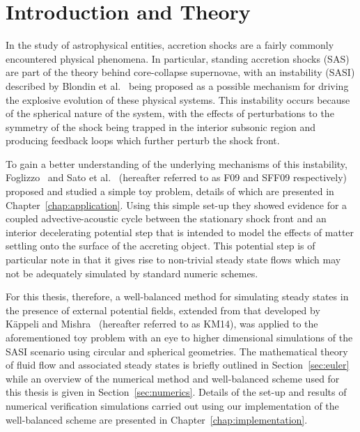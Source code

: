\newcommand{\package}{\emph}

\chapter{Introduction and Theory}
\label{chap:introduction}

In the study of astrophysical entities, accretion shocks are a fairly commonly encountered physical phenomena. In particular, standing accretion shocks (SAS) are part of the theory behind core-collapse supernovae, with an instability (SASI) described by Blondin et al.~\cite{Blondin2003} being proposed as a possible mechanism for driving the explosive evolution of these physical systems. This instability occurs because of the spherical nature of the system, with the effects of perturbations to the symmetry of the shock being trapped in the interior subsonic region and producing feedback loops which further perturb the shock front.

To gain a better understanding of the underlying mechanisms of this instability, Foglizzo~\cite{Foglizzo2009} and Sato et al.~\cite{Sato2009} (hereafter referred to as F09 and SFF09 respectively) proposed and studied a simple toy problem, details of which are presented in Chapter~\ref{chap:application}. Using this simple set-up they showed evidence for a coupled advective-acoustic cycle between the stationary shock front and an interior decelerating potential step that is intended to model the effects of matter settling onto the surface of the accreting object. This potential step is of particular note in that it gives rise to non-trivial steady state flows which may not be adequately simulated by standard numeric schemes.

For this thesis, therefore, a well-balanced method for simulating steady states in the presence of external potential fields, extended from that developed by K\"appeli and Mishra~\cite{Kappeli2014} (hereafter referred to as KM14), was applied to the aforementioned toy problem with an eye to higher dimensional simulations of the SASI scenario using circular and spherical geometries. The mathematical theory of fluid flow and associated steady states is briefly outlined in Section~\ref{sec:euler} while an overview of the numerical method and well-balanced scheme used for this thesis is given in Section~\ref{sec:numerics}. Details of the set-up and results of numerical verification simulations carried out using our implementation of the well-balanced scheme are presented in Chapter~\ref{chap:implementation}.


